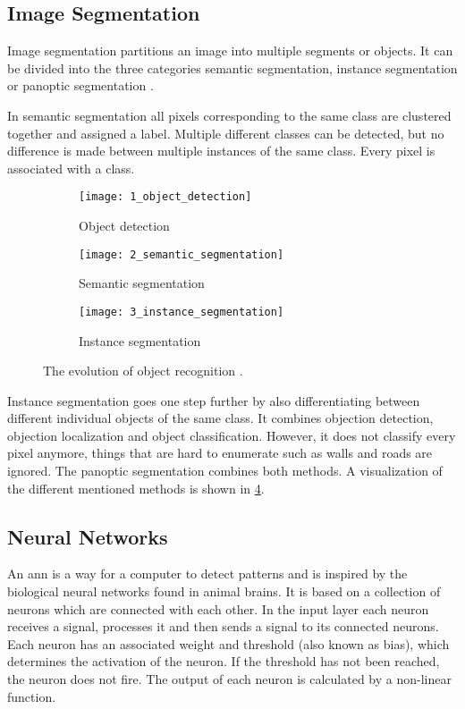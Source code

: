 \subsection{Image Segmentation}
Image segmentation partitions an image into multiple segments or objects.
It can be divided into the three categories semantic segmentation, instance segmentation or panoptic segmentation \cite{Minaee2021}.\par
In semantic segmentation all pixels corresponding to the same class are clustered together and assigned a label.
Multiple different classes can be detected, but no difference is made between multiple instances of the same class.
Every pixel is associated with a class.\par
\begin{figure}[htb]
	\centering
	\begin{subfigure}{0.3\textwidth}
		\centering
		\texttt{[image: 1\_object\_detection]}
		\caption{Object detection}
		\label{fig:object_detection}
	\end{subfigure}
	\begin{subfigure}{0.3\textwidth}
		\centering
		\texttt{[image: 2\_semantic\_segmentation]}
		\caption{Semantic segmentation}
		\label{fig:semantic_segmentation}
	\end{subfigure}
	\begin{subfigure}{0.3\textwidth}
		\centering
		\texttt{[image: 3\_instance\_segmentation]}
		\caption{Instance segmentation}
		\label{fig:instance_segmentation}
	\end{subfigure}
	\caption[Evolution of object recognition]{The evolution of object recognition \cite{Garcia2017}.}
	\label{fig:object_recognition}
\end{figure}
Instance segmentation goes one step further by also differentiating between different individual objects of the same class.
It combines objection detection, objection localization and object classification.
However, it does not classify every pixel anymore, things that are hard to enumerate such as walls and roads are ignored.
The panoptic segmentation combines both methods.
A visualization of the different mentioned methods is shown in \cref{fig:object_recognition}.



\subsection{Neural Networks}
An \gls{ann} is a way for a computer to detect patterns and is inspired by the biological neural networks found in animal brains.
It is based on a collection of neurons which are connected with each other.
In the input layer each neuron receives a signal, processes it and then sends a signal to its connected neurons.
Each neuron has an associated weight and threshold (also known as bias), which determines the activation of the neuron.
If the threshold has not been reached, the neuron does not fire.
The output of each neuron is calculated by a non-linear function.

